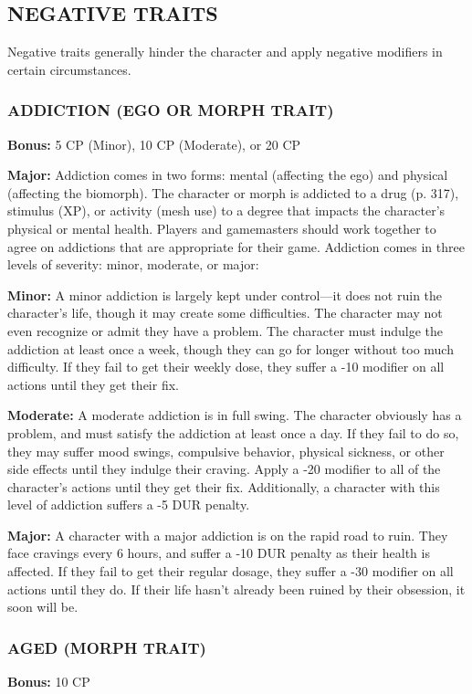 \subsection{NEGATIVE TRAITS}

Negative traits generally hinder the character and apply negative modifiers in
certain circumstances.

\subsubsection{ADDICTION (EGO OR MORPH TRAIT)}
\textbf{Bonus:} 5 CP (Minor), 10 CP (Moderate), or 20 CP

\textbf{Major:} Addiction comes in two forms: mental (affecting the ego) and
physical (affecting the biomorph). The character or morph is addicted to a drug
(p. 317), stimulus (XP), or activity (mesh use) to a degree that impacts the
character’s physical or mental health.  Players and gamemasters should work
together to agree on addictions that are appropriate for their game. Addiction
comes in three levels of severity: minor, moderate, or major:

\textbf{Minor:} A minor addiction is largely kept under control—it does not
ruin the character’s life, though it may create some difficulties. The
character may not even recognize or admit they have a problem. The character
must indulge the addiction at least once a week, though they can go for longer
without too much difficulty. If they fail to get their weekly dose, they suffer
a -10 modifier on all actions until they get their fix.

\textbf{Moderate:} A moderate addiction is in full swing.  The character
obviously has a problem, and must satisfy the addiction at least once a day. If
they fail to do so, they may suffer mood swings, compulsive behavior, physical
sickness, or other side effects until they indulge their craving. Apply a -20
modifier to all of the character’s actions until they get their fix.
Additionally, a character with this level of addiction suffers a -5 DUR
penalty.

\textbf{Major:} A character with a major addiction is on the rapid road to
ruin. They face cravings every 6 hours, and suffer a -10 DUR penalty as their
health is affected. If they fail to get their regular dosage, they suffer a -30
modifier on all actions until they do. If their life hasn’t already been ruined
by their obsession, it soon will be.

\subsubsection{AGED (MORPH TRAIT)}
\textbf{Bonus:} 10 CP

